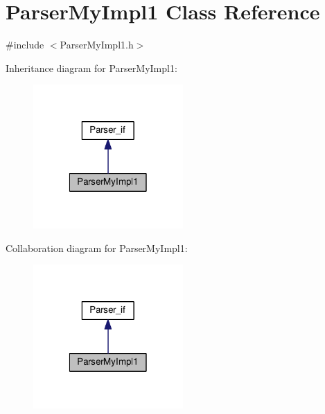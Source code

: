 \hypertarget{class_parser_my_impl1}{\section{Parser\-My\-Impl1 Class Reference}
\label{class_parser_my_impl1}
}


{\ttfamily \#include $<$Parser\-My\-Impl1.\-h$>$}



Inheritance diagram for Parser\-My\-Impl1\-:
\nopagebreak
\begin{figure}[H]
\begin{center}
\leavevmode
\includegraphics[width=162pt]{class_parser_my_impl1__inherit__graph}
\end{center}
\end{figure}


Collaboration diagram for Parser\-My\-Impl1\-:
\nopagebreak
\begin{figure}[H]
\begin{center}
\leavevmode
\includegraphics[width=162pt]{class_parser_my_impl1__coll__graph}
\end{center}
\end{figure}
